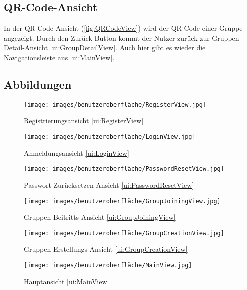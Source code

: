 \documentclass[parskip=full]{scrartcl}
\begin{document}
\subsection{QR-Code-Ansicht}
\label{ui:QRCodeView}
In der QR-Code-Ansicht (\autoref{fig:QRCodeView}) wird der QR-Code einer Gruppe angezeigt. Durch den Zurück-Button kommt der Nutzer zurück zur Gruppen-Detail-Ansicht \ref{ui:GroupDetailView}. Auch hier gibt es wieder die Navigationsleiste aus \ref{ui:MainView}.
\newpage

\subsection*{Abbildungen}
\begin{figure}[htp]
    \begin{minipage}
        [t]{0.49\textwidth}
        \centering
        \texttt{[image: images/benutzeroberfläche/RegisterView.jpg]}
        \caption{Registrierungsansicht \ref{ui:RegisterView}}
        \label{fig:RegisterView}
    \end{minipage}
    \begin{minipage}
        [t]{0.49\textwidth}
        \centering
        \texttt{[image: images/benutzeroberfläche/LoginView.jpg]}
        \caption{Anmeldungsansicht \ref{ui:LoginView}}
        \label{fig:LoginView}
    \end{minipage}
\end{figure}
\begin{figure}[htp]
    \begin{minipage}
        [t]{0.49\textwidth}
        \centering
        \texttt{[image: images/benutzeroberfläche/PasswordResetView.jpg]}
        \caption{Passwort-Zurücksetzen-Ansicht \ref{ui:PasswordResetView}}
        \label{fig:PasswordResetView}
    \end{minipage}
    \begin{minipage}
        [t]{0.49\textwidth}
        \centering
        \texttt{[image: images/benutzeroberfläche/GroupJoiningView.jpg]}
        \caption{Gruppen-Beitritts-Ansicht \ref{ui:GroupJoiningView}}
        \label{fig:GroupJoiningView}
    \end{minipage}
\end{figure}
\begin{figure}[htp]
    \begin{minipage}
        [t]{0.49\textwidth}
        \centering
        \texttt{[image: images/benutzeroberfläche/GroupCreationView.jpg]}
        \caption{Gruppen-Erstellungs-Ansicht \ref{ui:GroupCreationView}}
        \label{fig:GroupCreationView}
    \end{minipage}
    \begin{minipage}
        [t]{0.49\textwidth}
        \centering
        \texttt{[image: images/benutzeroberfläche/MainView.jpg]}
        \caption{Hauptansicht \ref{ui:MainView}}
        \label{fig:MainView}
    \end{minipage}
\end{figure}
\end{document}
